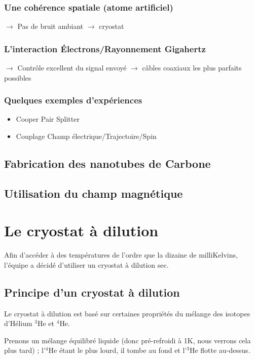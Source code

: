 \documentclass[a4paper,11pt]{report}
\newcommand{\HeT}{$^3$He\xspace}
\newcommand{\HeQ}{$^4$He\xspace}
\begin{document}
\subsection{Une cohérence spatiale (atome artificiel)}
$\rightarrow$ Pas de bruit ambiant $\rightarrow$ cryostat

\subsection{L'interaction Électrons/Rayonnement Gigahertz}
$\rightarrow$ Contrôle excellent du signal envoyé $\rightarrow$ câbles coaxiaux les plus parfaits possibles

\subsection{Quelques exemples d'expériences}
\begin{itemize}
    \item Cooper Pair Splitter
    \item Couplage Champ électrique/Trajectoire/Spin
\end{itemize}

\section{Fabrication des nanotubes de Carbone}

\section{Utilisation du champ magnétique}

\chapter{Le cryostat à dilution}
Afin d'accéder à des températures de l'ordre que la dizaine de milliKelvins, l'équipe a décidé d'utiliser un cryostat à dilution sec.
\section{Principe d'un cryostat à dilution}
Le cryostat à dilution est basé sur certaines propriétés du mélange des isotopes d'Hélium \HeT et \HeQ.
\newline

Prenons un mélange équilibré liquide (donc pré-refroidi à 1K, nous verrons cela plus tard) ; l'\HeQ étant le plus lourd, il tombe au fond et l'\HeT flotte au-dessus.
\end{document}
